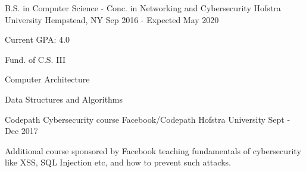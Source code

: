 

\begin{cventries}

  \cventry
    {B.S. in Computer Science - Conc. in Networking and Cybersecurity} %
    {Hofstra University} %
    {Hempstead, NY} %
    {Sep 2016 - Expected May 2020} %
    {
      \begin{cvitems} %
        \item {Current GPA: 4.0} 
        \item {Fund. of C.S. III}
        \item {Computer Architecture}
        \item {Data Structures and Algorithms}
      \end{cvitems}
    }

  \cventry
    {Codepath Cybersecurity course} %
    {Facebook/Codepath} %
    {Hofstra University} %
    {Sept - Dec 2017} %
    {
      \begin{cvitems} %
        \item {Additional course sponsored by Facebook teaching fundamentals of cybersecurity like XSS, SQL Injection etc, and how to prevent such attacks.}
      \end{cvitems}
    }

\end{cventries}
